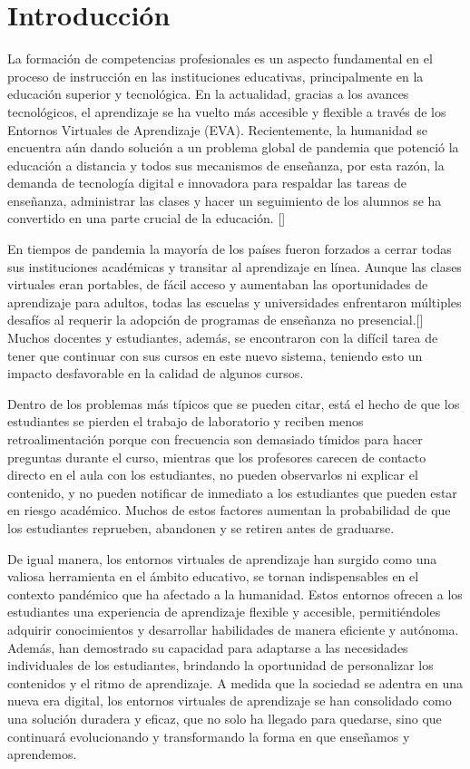 \chapter*{Introducción}\label{chapter:introduction}
La formación de competencias profesionales es un aspecto fundamental en el proceso de instrucción en las 
instituciones educativas, principalmente en la educación superior y tecnológica. En la actualidad, 
gracias a los avances tecnológicos, el aprendizaje se ha vuelto más accesible y flexible a través de 
los Entornos Virtuales de Aprendizaje (EVA). Recientemente, la humanidad se encuentra aún dando 
solución a un problema global de pandemia que potenció la educación a distancia y todos sus mecanismos 
de enseñanza, por esta razón, la demanda de tecnología digital e innovadora para respaldar las tareas de 
enseñanza, administrar las clases y hacer un seguimiento de los alumnos se ha convertido en una parte 
crucial de la educación. [\cite{CrucialEdu}] 

En tiempos de pandemia la mayoría de los países fueron forzados a cerrar todas sus instituciones académicas 
y transitar al aprendizaje en línea. Aunque las clases virtuales eran portables, de fácil acceso 
y aumentaban las oportunidades de aprendizaje para adultos, todas las escuelas y universidades enfrentaron 
múltiples desafíos al requerir la adopción de programas de enseñanza no presencial.[\cite{Conferencia,Journal}] Muchos 
docentes y estudiantes, además, se encontraron con la difícil tarea de tener que continuar con sus cursos 
en este nuevo sistema, teniendo esto un impacto desfavorable en la calidad de algunos cursos. 

Dentro de los problemas más típicos que 
se pueden citar, está el hecho de que los estudiantes se pierden el trabajo de laboratorio y reciben 
menos retroalimentación porque con frecuencia son demasiado tímidos para hacer preguntas durante el curso, 
mientras que los profesores carecen de contacto directo en el aula con los estudiantes, no pueden 
observarlos ni explicar el contenido, y no pueden notificar de inmediato a los estudiantes que pueden 
estar en riesgo académico. Muchos de estos factores aumentan la probabilidad de que los estudiantes reprueben, 
abandonen y se retiren antes de graduarse. 

De igual manera, los entornos virtuales de aprendizaje han surgido como una valiosa 
herramienta en el ámbito educativo, se tornan indispensables en el contexto pandémico
que ha afectado a la humanidad. Estos entornos ofrecen a los estudiantes una 
experiencia de aprendizaje flexible y accesible, permitiéndoles adquirir 
conocimientos y desarrollar habilidades de manera eficiente y autónoma. Además, 
han demostrado su capacidad para adaptarse a las necesidades individuales de los 
estudiantes, brindando la oportunidad de personalizar los contenidos y el ritmo 
de aprendizaje. A medida que la sociedad se adentra en una nueva era digital, 
los entornos virtuales de aprendizaje se han consolidado como una solución 
duradera y eficaz, que no solo ha llegado para quedarse, sino que continuará 
evolucionando y transformando la forma en que enseñamos y aprendemos.

